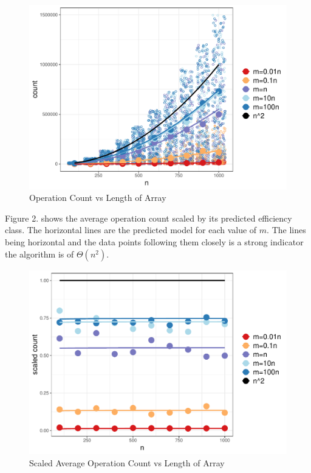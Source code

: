 \documentclass{article}
\begin{document}
\begin{figure}[htbp]
\includegraphics{report-plot1}
\caption{Operation Count vs Length of Array}
\end{figure}

\pagebreak

Figure 2. shows the average operation count scaled by its predicted efficiency class. The horizontal lines are the predicted model for each value of $m$. The lines being horizontal and the data points following them closely is a strong indicator the algorithm is of $\Theta(n^2)$.

\begin{figure}[htbp]
\includegraphics{report-plot2}
\caption{Scaled Average Operation Count vs Length of Array}
\end{figure}
 
\end{document}
